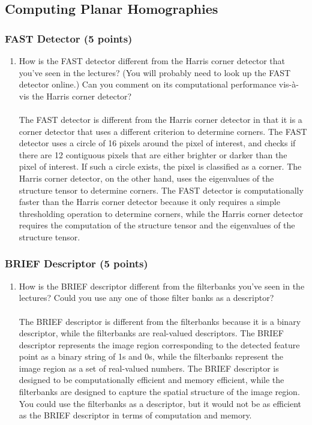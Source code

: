 \documentclass[a3paper,12pt]{extarticle} %
\begin{document}
    \subsection{ Computing Planar Homographies}
    \subsubsection{FAST Detector (5 points)}
    \begin{enumerate}
        \item How is the FAST detector different from the Harris corner detector that you’ve seen in the lectures? (You will probably need to look up the FAST detector online.) Can you comment on its computational performance vis-à-vis the Harris corner detector?
        \\\\ The FAST detector is different from the Harris corner detector in that it is a corner detector that uses a different criterion to determine corners. The FAST detector uses a circle of 16 pixels around the pixel of interest, and checks if there are 12 contiguous pixels that are either brighter or darker than the pixel of interest. If such a circle exists, the pixel is classified as a corner. The Harris corner detector, on the other hand, uses the eigenvalues of the structure tensor to determine corners. The FAST detector is computationally faster than the Harris corner detector because it only requires a simple thresholding operation to determine corners, while the Harris corner detector requires the computation of the structure tensor and the eigenvalues of the structure tensor.
    \end{enumerate}

    \subsubsection{BRIEF Descriptor (5 points)}
    \begin{enumerate}
        \item How is the BRIEF descriptor different from the filterbanks you’ve seen in the lectures? Could you use any one of those filter banks as a descriptor?
        \\\\ The BRIEF descriptor is different from the filterbanks because it is a binary descriptor, while the filterbanks are real-valued descriptors. The BRIEF descriptor represents the image region corresponding to the detected feature point as a binary string of 1s and 0s, while the filterbanks represent the image region as a set of real-valued numbers. The BRIEF descriptor is designed to be computationally efficient and memory efficient, while the filterbanks are designed to capture the spatial structure of the image region. You could use the filterbanks as a descriptor, but it would not be as efficient as the BRIEF descriptor in terms of computation and memory.
    \end{enumerate}
\end{document}
